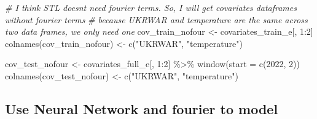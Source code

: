 \documentclass[
]{article}
\newenvironment{Shaded}{\begin{snugshade}}{\end{snugshade}}
\newcommand{\AttributeTok}[1]{\textcolor[rgb]{0.77,0.63,0.00}{#1}}
\newcommand{\CommentTok}[1]{\textcolor[rgb]{0.56,0.35,0.01}{\textit{#1}}}
\newcommand{\DecValTok}[1]{\textcolor[rgb]{0.00,0.00,0.81}{#1}}
\newcommand{\FunctionTok}[1]{\textcolor[rgb]{0.00,0.00,0.00}{#1}}
\newcommand{\NormalTok}[1]{#1}
\newcommand{\OtherTok}[1]{\textcolor[rgb]{0.56,0.35,0.01}{#1}}
\newcommand{\SpecialCharTok}[1]{\textcolor[rgb]{0.00,0.00,0.00}{#1}}
\newcommand{\StringTok}[1]{\textcolor[rgb]{0.31,0.60,0.02}{#1}}
\begin{document}
\begin{Shaded}
\begin{Highlighting}[]
\CommentTok{\# I think STL doesn\textquotesingle{}t need fourier terms. So, I will get covariates dataframes without fourier terms}
\CommentTok{\# because UKRWAR and temperature are the same across two data frames, we only need one}
\NormalTok{cov\_train\_nofour }\OtherTok{\textless{}{-}}\NormalTok{ covariates\_train\_e[, }\DecValTok{1}\SpecialCharTok{:}\DecValTok{2}\NormalTok{]}
\FunctionTok{colnames}\NormalTok{(cov\_train\_nofour) }\OtherTok{\textless{}{-}} \FunctionTok{c}\NormalTok{(}\StringTok{"UKRWAR"}\NormalTok{, }\StringTok{"temperature"}\NormalTok{)}

\NormalTok{cov\_test\_nofour }\OtherTok{\textless{}{-}}\NormalTok{ covariates\_full\_e[, }\DecValTok{1}\SpecialCharTok{:}\DecValTok{2}\NormalTok{] }\SpecialCharTok{\%\textgreater{}\%} 
  \FunctionTok{window}\NormalTok{(}\AttributeTok{start =} \FunctionTok{c}\NormalTok{(}\DecValTok{2022}\NormalTok{, }\DecValTok{2}\NormalTok{))}
\FunctionTok{colnames}\NormalTok{(cov\_test\_nofour) }\OtherTok{\textless{}{-}} \FunctionTok{c}\NormalTok{(}\StringTok{"UKRWAR"}\NormalTok{, }\StringTok{"temperature"}\NormalTok{)}
\end{Highlighting}
\end{Shaded}

\hypertarget{use-neural-network-and-fourier-to-model}{%
\subsection{Use Neural Network and fourier to
model}\label{use-neural-network-and-fourier-to-model}}
\end{document}
